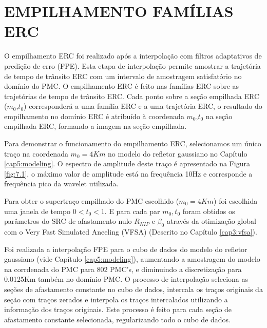 %
% 
% 
% 
% 
% 
% 

\chapter{EMPILHAMENTO FAMÍLIAS ERC}
\label{cap7:empilhamento}

O empilhamento ERC foi realizado após a interpolação com filtros adaptativos de predição de erro (FPE). Esta etapa de
interpolação permite amostrar a trajetória de tempo de trânsito ERC com um intervalo de amostragem satisfatório no
domínio do PMC. O empilhamento ERC é feito nas famílias ERC sobre as trajetórias de tempo de trânsito ERC. Cada ponto sobre
a seção empilhada ERC ($m_0$,$t_0$) corresponderá a uma família ERC e a uma trajetória ERC, 
o resultado do empilhamento no domínio
ERC é atribuído à coordenada $m_0$,$t_0$ na seção empilhada ERC, formando a imagem na seção empilhada.

Para demonstrar o funcionamento do empilhamento ERC, selecionamos um único traço na coordenada $m_0=4Km$ no modelo do refletor
gaussiano no Capítulo \ref{cap5:modeling}. O espectro de amplitude deste traço é apresentado na Figura \ref{fig:7.1},
o máximo valor de amplitude 
está na frequência 10Hz e corresponde a frequência pico da wavelet utilizada.

Para obter o supertraço empilhado do PMC escolhido ($m_0=4Km$) foi escolhida uma janela de tempo $0<t_0<1$.
E para cada par $m_0, t_0$ foram obtidos os parâmetros do SRC de afastamento nulo $R_{NIP}$ e $\beta_0$ 
através da otimização global com o Very Fast Simulated Aneeling (VFSA) (Descrito no Capítulo \ref{cap3:vfsa}).

Foi realizada a interpolação FPE para o cubo de dados do modelo do refletor gaussiano (vide Capítulo \ref{cap5:modeling}),
aumentando a amostragem
do modelo na corrdenada do PMC para 802 PMC's, e diminuindo a discretização para 0.0125Km também no domínio PMC. O processo 
de interpolação seleciona as seções de afastamento constante no cubo de dados, intercala os traços originais da seção com traços 
zerados e interpola os traços intercalados utilizando a informação dos traços originais. Este processo é feito para cada seção
de afastamento constante selecionada, regularizando todo o cubo de dados.

